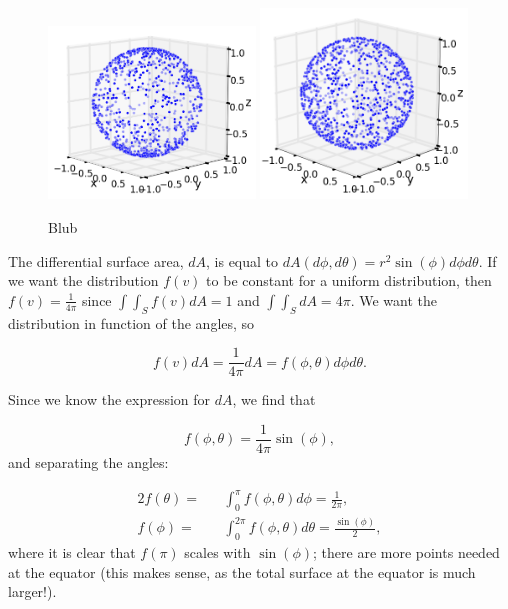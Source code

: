 \begin{appendices}
\begin{figure}
\centering
\includegraphics[width=0.49\textwidth]{appendix/img/badrandom.png}
\includegraphics[width=0.49\textwidth]{appendix/img/goodrandom.png}
\caption{Blub}
\label{fig:sphere}
\end{figure}

\noindent The differential surface area, $dA$, is equal to $dA(d\phi,d\theta) = r^2 \sin(\phi) d\phi d\theta$. If we want the distribution $f(v)$ to be constant for a uniform distribution, then $f(v) = \frac{1}{4\pi}$ since $\int \int_S f(v)dA = 1$ and $\int \int_S dA = 4\pi$. We want the distribution in function of the angles, so

\begin{equation}
f(v)dA = \frac{1}{4\pi} dA = f(\phi,\theta)d\phi d\theta.
\end{equation}

\noindent Since we know the expression for $dA$, we find that

\begin{equation}
f(\phi,\theta) = \frac{1}{4\pi} \sin(\phi),
\end{equation}
and separating the angles:

\begin{alignat}{2}
f(\theta) =&& \int^\pi_0 f(\phi,\theta)d\phi = \frac{1}{2\pi}, \\
f(\phi)   =&& \int^{2\pi}_0 f(\phi,\theta)d\theta = \frac{\sin(\phi)}{2},
\end{alignat}
\noindent where it is clear that $f(\pi)$ scales with $\sin(\phi)$; there are more points needed at the equator (this makes sense, as the total surface at the equator is much larger!).\\


\end{appendices}
